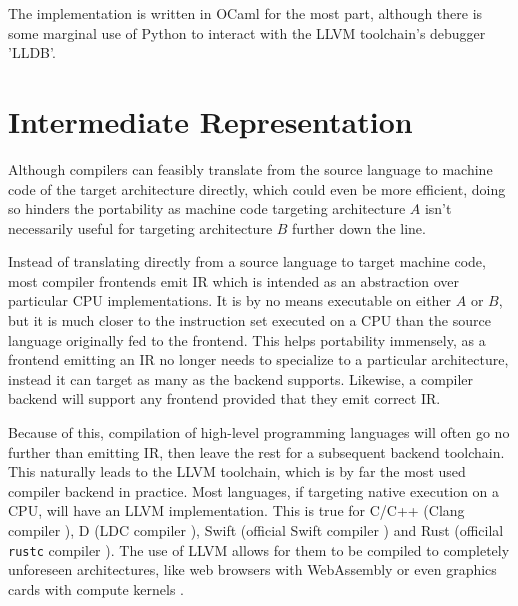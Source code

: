 \documentclass{article}
\begin{document}
The implementation is written in OCaml for the most part, although there is some marginal use of Python to interact with the LLVM toolchain's debugger 'LLDB'.







\section{Intermediate Representation}


Although compilers can feasibly translate from the source language to machine code of the target architecture directly, which could even be more efficient, doing so hinders the portability as machine code targeting architecture \(A\) isn't necessarily useful for targeting architecture \(B\) further down the line.

Instead of translating directly from a source language to target machine code, most compiler frontends emit IR which is intended as an abstraction over particular CPU implementations. %
It is by no means executable on either \(A\) or \(B\), but it is much closer to the instruction set executed on a CPU than the source language originally fed to the frontend.  This helps portability immensely, as a frontend emitting an IR no longer needs to specialize to a particular architecture, instead it can target as many as the backend supports.
Likewise, a compiler backend will support any frontend provided that they emit correct IR.

Because of this, compilation of high-level programming languages will often go no further than emitting IR, then leave the rest for a subsequent backend toolchain. This naturally leads to the LLVM toolchain, which is by far the most used compiler backend in practice. Most languages, if targeting native execution on a CPU, will have an LLVM implementation. This is true for C/C++ (Clang compiler \cite{clang}), D (LDC compiler \cite{dlang}), Swift (official Swift compiler \cite{swift}) and Rust (officilal \texttt{rustc} compiler \cite{rustc}). The use of LLVM allows for them to be compiled to completely unforeseen architectures, like web browsers with WebAssembly or even graphics cards with compute kernels \cite{backend}.
\end{document}
